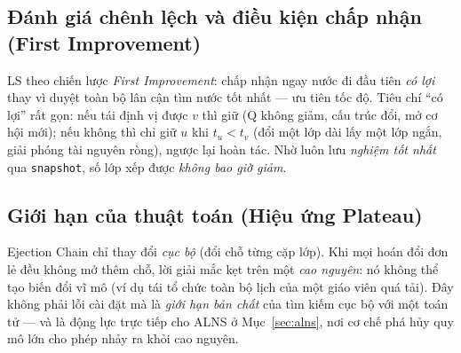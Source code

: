 \subsection{Đánh giá chênh lệch và điều kiện chấp nhận (First Improvement)}
LS theo chiến lược \emph{First Improvement}: chấp nhận ngay nước đi đầu tiên
\emph{có lợi} thay vì duyệt toàn bộ lân cận tìm nước tốt nhất --- ưu tiên tốc độ.
Tiêu chí ``có lợi'' rất gọn: nếu tái định vị được $v$ thì giữ (Q không giảm, cấu
trúc đổi, mở cơ hội mới); nếu không thì chỉ giữ $u$ khi $t_u<t_v$ (đổi một lớp dài
lấy một lớp ngắn, giải phóng tài nguyên ròng), ngược lại hoàn tác. Nhờ luôn lưu
\emph{nghiệm tốt nhất} qua \texttt{snapshot}, số lớp xếp được \emph{không bao giờ
giảm}.

\subsection{Giới hạn của thuật toán (Hiệu ứng Plateau)}
Ejection Chain chỉ thay đổi \emph{cục bộ} (đổi chỗ từng cặp lớp). Khi mọi hoán đổi
đơn lẻ đều không mở thêm chỗ, lời giải mắc kẹt trên một \emph{cao nguyên}: nó không
thể tạo biến đổi vĩ mô (ví dụ tái tổ chức toàn bộ lịch của một giáo viên quá tải).
Đây không phải lỗi cài đặt mà là \emph{giới hạn bản chất} của tìm kiếm cục bộ với
một toán tử --- và là động lực trực tiếp cho ALNS ở Mục~\ref{sec:alns}, nơi cơ chế
phá hủy quy mô lớn cho phép nhảy ra khỏi cao nguyên.

